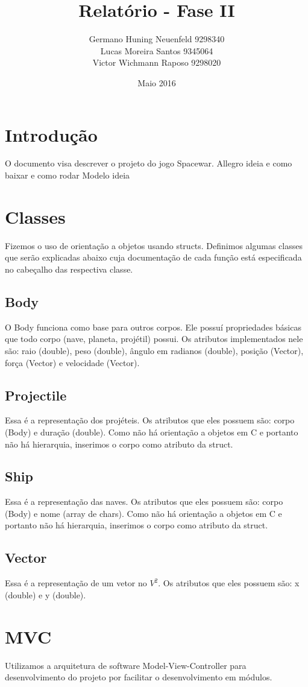 \documentclass{article}
\title{Relatório - Fase II}
\author{
    Germano Huning Neuenfeld 9298340
    \\
    Lucas Moreira Santos 9345064
    \\
    Victor Wichmann Raposo 9298020
}
\date{Maio 2016}
\begin{document}
\maketitle
\section{Introdução}
O documento visa descrever o projeto do jogo Spacewar.
Allegro ideia e como baixar e como rodar 
Modelo ideia
\section{Classes}
Fizemos o uso de orientação a objetos usando structs. Definimos algumas classes que serão explicadas abaixo
cuja documentação de cada função está especificada no cabeçalho das respectiva classe.

\subsection{Body}
O Body funciona como base para outros corpos. Ele possuí propriedades básicas que todo corpo (nave, planeta, projétil) possui.
Os atributos implementados nele são: raio (double), peso (double), ângulo em radianos (double), posição (Vector), força (Vector) e velocidade (Vector).

\subsection{Projectile}
Essa é a representação dos projéteis. Os atributos que eles possuem são: corpo (Body) e duração (double).
Como não há orientação a objetos em C e portanto não há hierarquia, inserimos o corpo como atributo da struct.

\subsection{Ship}
Essa é a representação das naves. Os atributos que eles possuem são: corpo (Body) e nome (array de chars).
Como não há orientação a objetos em C e portanto não há hierarquia, inserimos o corpo como atributo da struct.

\subsection{Vector}
Essa é a representação de um vetor no $V^2$. Os atributos que eles possuem são: x (double) e y (double).

\section{MVC}
Utilizamos a arquitetura de software Model-View-Controller para desenvolvimento do projeto por facilitar o desenvolvimento em módulos.
\end{document}

